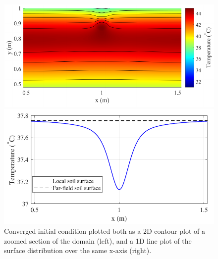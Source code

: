         \begin{figure}[htbp]
            \centering
            \begin{minipage}[b]{0.48\textwidth} %
                \includegraphics[width=\textwidth]{figs/Rory/thermal_result.pdf}
            \end{minipage}
            \hfill %
            \begin{minipage}[b]{0.48\textwidth} %
                \includegraphics[width=\textwidth]{figs/Rory/1D_distribution_cropped.pdf}
            \end{minipage}
            \caption{Converged initial condition plotted both as a 2D contour plot of a zoomed section of the domain (left), and a 1D line plot of the surface distribution over the same x-axis (right).}
            \label{fig:combined_thermal} %
        \end{figure}
    
